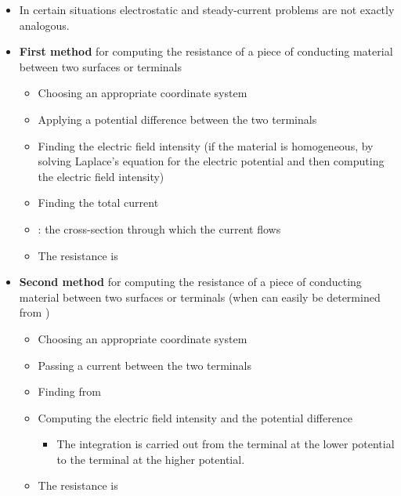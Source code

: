 \begin{ELunit}

\begin{itemize}
\tightlist
\item
  In certain situations electrostatic and steady-current problems are not exactly analogous.
\item
  \textbf{First method} for computing the resistance of a piece of conducting material between two surfaces or terminals

  \begin{itemize}
  \tightlist
  \item
    Choosing an appropriate coordinate system
  \item
    Applying a potential difference  between the two terminals
  \item
    Finding the electric field intensity (if the material is homogeneous, by solving Laplace's equation for the electric potential and then computing the electric field intensity)
  \item
    Finding the total current
  \item
    : the cross-section through which the current flows
  \item
    The resistance is 
  \end{itemize}
\item
  \textbf{Second method} for computing the resistance of a piece of conducting material between two surfaces or terminals (when  can easily be determined from )

  \begin{itemize}
  \tightlist
  \item
    Choosing an appropriate coordinate system
  \item
    Passing a current  between the two terminals
  \item
    Finding  from 
  \item
    Computing the electric field intensity  and the potential difference 

    \begin{itemize}
    \tightlist
    \item
      The integration is carried out from the terminal at the lower potential to the terminal at the higher potential.
    \end{itemize}
  \item
    The resistance is 
  \end{itemize}
\end{itemize}

\end{ELunit}


